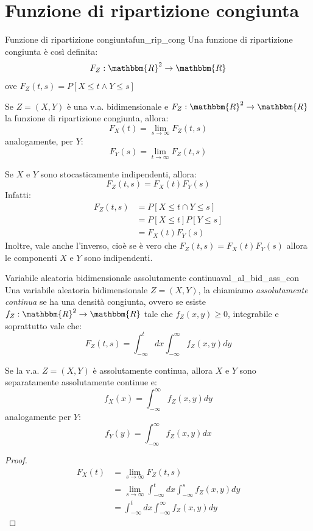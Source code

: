 \documentclass[12pt]{report}
\newcounter{definition}
\newcommand{\nmu}{}
\begin{document}
	\section{Funzione di ripartizione congiunta}
	\begin{definition}{\nmu Funzione di ripartizione congiunta}{fun_rip_cong}
		Una funzione di ripartizione congiunta è così definita:
		\[
		F_Z: \mathbbm{R}^2 \to \mathbbm{R}
		\]
		ove $F_Z(t, s) = P[X \leq t \wedge Y \leq s]$
	\end{definition}
	Se $Z = (X, Y)$ è una v.a. bidimensionale e $F_Z: \mathbbm{R}^2 \to \mathbbm{R}$ la funzione di ripartizione congiunta, allora:
	\[
	F_X(t) = \lim\limits_{s \to \infty}F_Z(t, s)
	\]
	analogamente, per $Y$:
	\[
	F_Y(s) = \lim\limits_{t \to \infty}F_Z(t, s)
	\]
	\begin{note}{}{}
		Se $X$ e $Y$ sono stocasticamente indipendenti, allora:
		\[
		F_Z(t, s) = F_X(t)F_Y(s)
		\]
		Infatti:
		\begin{align*}
		F_Z(t, s) &= P[X \leq t \cap Y \leq s] \\
		&= P[X \leq t]P[Y \leq s] \\
		&= F_X(t)F_Y(s)
		\end{align*}
		Inoltre, vale anche l'inverso, cioè se è vero che $F_Z(t, s) = F_X(t)F_Y(s)$ allora le componenti $X$ e $Y$ sono indipendenti.
	\end{note}
	\begin{definition}{\nmu Variabile aleatoria bidimensionale assolutamente continua}{val_al_bid_ass_con}
		Una variabile aleatoria bidimensionale $Z = (X, Y)$, la chiamiamo \textit{assolutamente continua} se ha una densità congiunta, ovvero se esiste $f_Z: \mathbbm{R}^2 \to \mathbbm{R}$ tale che $f_Z(x, y) \geq 0$, integrabile e soprattutto vale che:
		\[
		F_Z(t, s) = \int_{-\infty}^{t}dx\int_{-\infty}^{\infty}f_Z(x, y)dy
		\]
	\end{definition}
	Se la v.a. $Z = (X, Y)$ è assolutamente continua, allora $X$ e $Y$ sono separatamente assolutamente continue e:
	\[
	f_X(x) = \int_{-\infty}^{\infty}f_Z(x, y)dy
	\]
	analogamente per $Y$:
	\[
	f_Y(y) = \int_{-\infty}^{\infty}f_Z(x, y)dx
	\]
	\begin{proof}{}{}
		\begin{align*}
			F_X(t) &= \lim\limits_{s\to\infty}F_Z(t, s) \\
			&= \lim\limits_{s\to\infty}\int_{-\infty}^{t}dx\int_{-\infty}^{s}f_Z(x, y)dy \\
			&= \int_{-\infty}^{t}dx\int_{-\infty}^{\infty}f_Z(x, y)dy
		\end{align*}
	\end{proof}
\end{document}
